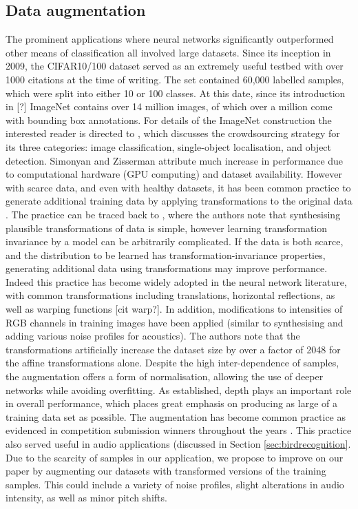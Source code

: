 \documentclass[12pt]{llncs}
\begin{document}
\subsection{Data augmentation}
The prominent applications where neural networks significantly outperformed other means of classification all involved large datasets. Since its inception in 2009, the CIFAR10/100 dataset \cite{krizhevsky2009learning} served as an extremely useful testbed with over 1000 citations at the time of writing. The set contained 60,000 labelled samples, which were split into either 10 or 100 classes. At this date, since its introduction in [?] ImageNet contains over 14 million images, of which over a million come with bounding box annotations. For details of the ImageNet construction the interested reader is directed to \cite[Section 3]{ILSVRC15}, which discusses the crowdsourcing strategy for its three categories: image classification, single-object localisation, and object detection. Simonyan and Zisserman \cite{simonyan2014very} attribute much increase in performance due to computational hardware (GPU computing) and dataset availability. However with scarce data, and even with healthy datasets, it has been common practice to generate additional training data by applying transformations to the original data \cite{hinton2012improving}. The practice can be traced back to \cite{simard2003best}, where the authors note that synthesising plausible transformations of data is simple, however learning transformation invariance by a model can be arbitrarily complicated. If the data is both scarce, and the distribution to be learned has transformation-invariance properties, generating additional data using transformations may improve performance. Indeed this practice has become widely adopted in the neural network literature, with common transformations including translations, horizontal reflections, as well as warping functions [cit warp?]. In addition, modifications to intensities of RGB channels in training images \cite{krizhevsky2012imagenet} have been applied (similar to synthesising and adding various noise profiles for acoustics). The authors note that the transformations artificially increase the dataset size by over a factor of 2048 for the affine transformations alone. Despite the high inter-dependence of samples, the augmentation offers a form of normalisation, allowing the use of deeper networks while avoiding overfitting. As established, depth plays an important role in overall performance, which places great emphasis on producing as large of a training data set as possible. The augmentation has become common practice as evidenced in competition submission winners throughout the years \cite{simonyan2014very,he2016deep,krizhevsky2012imagenet}. This practice also served useful in audio applications (discussed in Section \ref{sec:birdrecognition}. Due to the scarcity of samples in our application, we propose to improve on our paper by augmenting our datasets with transformed versions of the training samples. This could include a variety of noise profiles, slight alterations in audio intensity, as well as minor pitch shifts.
\end{document}
